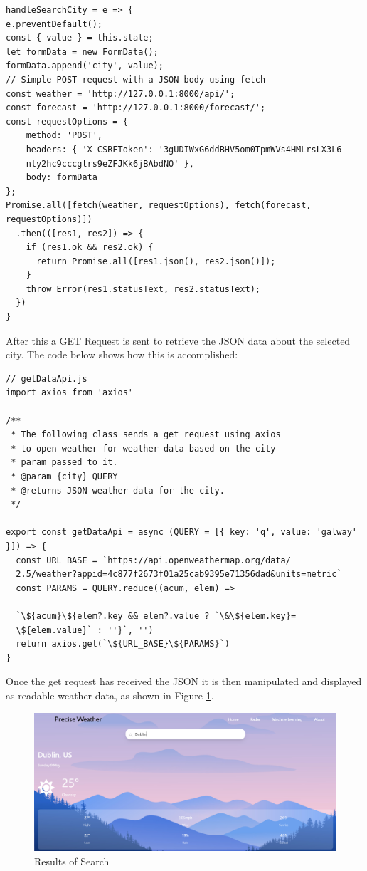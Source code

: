 \begin{verbatim}
handleSearchCity = e => {
e.preventDefault();
const { value } = this.state;
let formData = new FormData();
formData.append('city', value);
// Simple POST request with a JSON body using fetch
const weather = 'http://127.0.0.1:8000/api/';
const forecast = 'http://127.0.0.1:8000/forecast/';
const requestOptions = {
    method: 'POST',
    headers: { 'X-CSRFToken': '3gUDIWxG6ddBHV5om0TpmWVs4HMLrsLX3L6
    nly2hc9cccgtrs9eZFJKk6jBAbdNO' },
    body: formData
};
Promise.all([fetch(weather, requestOptions), fetch(forecast, requestOptions)])
  .then(([res1, res2]) => {
    if (res1.ok && res2.ok) {
      return Promise.all([res1.json(), res2.json()]);
    }
    throw Error(res1.statusText, res2.statusText);
  })
}
\end{verbatim}

After this a GET Request is sent to retrieve the JSON data about the selected city. The code below shows how this is accomplished:

\begin{verbatim}
// getDataApi.js
import axios from 'axios'

/**
 * The following class sends a get request using axios
 * to open weather for weather data based on the city 
 * param passed to it.
 * @param {city} QUERY 
 * @returns JSON weather data for the city.
 */
 
export const getDataApi = async (QUERY = [{ key: 'q', value: 'galway' }]) => {
  const URL_BASE = `https://api.openweathermap.org/data/
  2.5/weather?appid=4c877f2673f01a25cab9395e71356dad&units=metric`
  const PARAMS = QUERY.reduce((acum, elem) =>
  
  `\${acum}\${elem?.key && elem?.value ? `\&\${elem.key}=
  \${elem.value}` : ''}`, '')
  return axios.get(`\${URL_BASE}\${PARAMS}`)
}
\end{verbatim}

\newpage
Once the get request has received the JSON it is then manipulated and displayed as readable weather data, as shown in Figure \ref{Search}.

\begin{figure}[h]
\centering
\includegraphics[scale=0.4]{img/Searching.PNG}
\caption{Results of Search}
\label{Search}
\end{figure}

